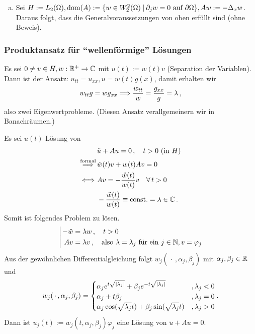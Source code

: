 \begin{bsp}
\begin{enumerate}[(a)]
\begin{proof}
\begin{align*}
\begin{aligned}
	& w_j \in \mathring W^2_2(\Omega), \mathring W^2_2(\Omega) \text{  abg. UVR von } W^2_2(\Omega)
\end{aligned}\, 
\right\} \Ra w \in \mathring W^2_2 (\Omega) \, ,
\end{align*}
d.h. $w \in \operatorname{dom}(A)$.
\end{proof}
\item Sei $H:=L_2(\Omega), \operatorname{dom}(A) :=\{w \in W^2_2(\Omega) \;\vert\, \partial_j w = 0 \text{ auf } \partial \Omega\}, Aw := -\Delta_x w$. Daraus folgt, dass die Generalvoraussetzungen von oben erfüllt sind (ohne Beweis).
\end{enumerate}
\end{bsp}

\subsubsection{Produktansatz für "`wellenförmige"' Lösungen}

Es sei $0 \neq v \in H, w : \mathbb{R}^+ \rightarrow \mathbb{C}$ mit $u(t) := w(t) v$ (Separation der Variablen). Dann ist der Ansatz: $u_{tt} = u_{xx}, u = w(t) g(x)$, damit erhalten wir
\[
	w_{tt} g = w g_{xx} \Longrightarrow \frac{w_{tt}}{w}=\frac{g_{xx}}g = \lambda \, ,
\]
also zwei Eigenwertprobleme. (Diesen Ansatz verallgemeinern wir in Banachräumen.)

Es sei $u(t)$ Lösung von
\begin{align*}
	& \ddot u + A u = 0 \, , \quad t > 0 \text{ (in } H) \\
	\stackrel{\scriptsize\text{formal}}{\Longrightarrow} \, & \ddot w (t) v + w(t) Av = 0 \\
	\Longleftrightarrow\ & Av = -\frac{\ddot w(t)}{w(t)} v \quad \forall \, t > 0 \\
	&  - \frac{\ddot w(t)}{w(t)} \equiv \text{const.} = \lambda \in \mathbb{C} \, .
\end{align*}
Somit ist folgendes Problem zu lösen.
\[
	\left| \, 
	\begin{aligned}
		-\ddot w & = \lambda w \, , \quad t > 0 \\
		Av & = \lambda v \, , \quad \text{also } \lambda = \lambda_j \text{ für ein } j \in\mathbb{N}, v = \varphi_j
	\end{aligned}
	\right.
\]
Aus der gewöhnlichen Differentialgleichung folgt $w_j(\, \cdot \,, \alpha_j, \beta_j)$ mit $\alpha_j, \beta_j \in \mathbb{R}$ und
\[
	w_j(\, \cdot\, , \alpha_j, \beta_j) = \begin{cases}
							\alpha_j e^{t\sqrt{\lvert \lambda_j\rvert}} + \beta_j e^{-t \sqrt{\lvert \lambda_j\rvert}} & , \lambda_j < 0 \\
							\alpha_j + t \beta_j & , \lambda_j = 0 \\
							\alpha_j \cos(\sqrt{\lambda_j} t) + \beta_j \sin(\sqrt{\lambda_j} t) & , \lambda_j > 0
						\end{cases}.
\]
Dann ist $u_j(t) := w_j(t,\alpha_j,\beta_j)\varphi_j$ eine Lösung von $\ddot u + Au = 0$.

